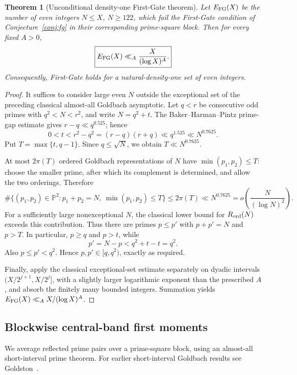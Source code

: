 \documentclass[final,11pt]{elsarticle}
\newtheorem{theorem}{Theorem}[section]
\theoremstyle{definition}
\theoremstyle{remark}
\newcommand{\PP}{\mathbb{P}}
\numberwithin{equation}{section}
\begin{document}
\begin{theorem}[Unconditional density-one First-Gate theorem]
\label{thm:almost-all-FG}
Let $E_{\rm FG}(X)$ be the number of even integers $N\le X$,
$N\ge122$, which fail the First-Gate condition of
Conjecture~\ref{conj:fg} in their corresponding prime-square block.
Then for every fixed $A>0$,
\[
 \boxed{E_{\rm FG}(X)\ll_A\frac{X}{(\log X)^A}.}
\]
Consequently, First-Gate holds for a natural-density-one set of even
integers.
\end{theorem}

\begin{proof}
It suffices to consider large even $N$ outside the exceptional set
of the preceding classical almost-all Goldbach asymptotic.
Let $q<r$ be consecutive odd primes with $q^2<N<r^2$, and write
$N=q^2+t$.  The Baker--Harman--Pintz prime-gap estimate
\cite{BHP2001} gives $r-q\ll q^{0.525}$; hence
\[
 0<t<r^2-q^2=(r-q)(r+q)\ll q^{1.525}
 \ll N^{0.7625}.
\]
Put $T=\max\{t,q-1\}$. Since $q\le\sqrt N$, we obtain
$T\ll N^{0.7625}$.

At most $2\pi(T)$ ordered Goldbach representations of $N$ have
$\min(p_1,p_2)\le T$: choose the smaller prime, after which its
complement is determined, and allow the two orderings.  Therefore
\[
 \#\{(p_1,p_2)\in\PP^2:p_1+p_2=N,
                 \ \min(p_1,p_2)\le T\}
 \le2\pi(T)\ll N^{0.7625}
 =o\!\left(\frac{N}{(\log N)^2}\right).
\]
For a sufficiently large nonexceptional $N$, the classical lower
bound for $R_{\rm ord}(N)$ exceeds this contribution. Thus there are
primes $p\le p'$ with $p+p'=N$ and $p>T$.
In particular, $p\ge q$ and $p>t$, while
\[
 p'=N-p<q^2+t-t=q^2.
\]
Also $p\le p'<q^2$.  Hence $p,p'\in[q,q^2)$, exactly as required.

Finally, apply the classical exceptional-set estimate separately on
dyadic intervals $(X/2^{j+1},X/2^j]$, with a slightly larger logarithmic
exponent than the prescribed $A$, and absorb the finitely many bounded
integers.  Summation yields $E_{\rm FG}(X)\ll_A X/(\log X)^A$.
\end{proof}

\subsection{Blockwise central-band first moments}
\label{subsec:blockwise-reflection}

We average reflected prime pairs over a prime-square block, using an almost-all
short-interval prime theorem. For earlier short-interval Goldbach results see
Goldston~\cite{Goldston1990}.
\end{document}
